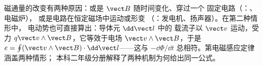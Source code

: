 \begin{remark}[同一定律的两种形式]\label{rem:b1:induction:twofaces}
磁通量的改变有两种原因：或是 $\vect B$ 随时间变化、穿过一个
固定电路（\emph{}：、电磁炉），
或是电路在恒定磁场中运动或形变
（\emph{}：发电机、扬声器）。在第二种情形中，
电动势也可直接算出：导体元 $\dd\vect l$ 中的
载流子以 $\vect v$ 运动，受力 $q\vect v\wedge
\vect B$，它等效于电场 $\vect v\wedge\vect B$，于是
$e = \oint(\vect v\wedge\vect B)\cdot\dd\vect l$——这与
$-\dd\Phi/\dd t$ 总相符。第电磁感应定律涵盖两种情形；
本科二年级分册解释了两种机制为何给出同一公式。
\end{remark}

